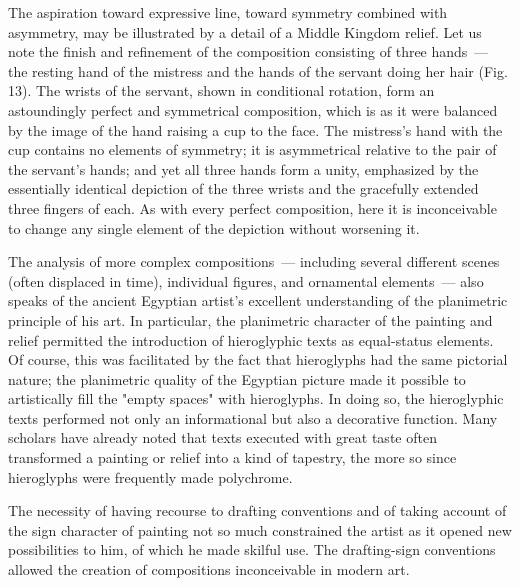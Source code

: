 

The aspiration toward expressive line, toward symmetry combined with asymmetry, may
be illustrated by a detail of a Middle Kingdom relief. Let us note the finish and
refinement of the composition consisting of three hands~--- the resting hand of the
mistress and the hands of the servant doing her hair (Fig.\,13). The wrists of the
servant, shown in conditional rotation, form an astoundingly perfect and symmetrical
composition, which is as it were balanced by the image of the hand raising a cup to the
face. The mistress's hand with the cup contains no elements of symmetry; it is
asymmetrical relative to the pair of the servant's hands; and yet all three hands form
a unity, emphasized by the essentially identical depiction of the three wrists and the
gracefully extended three fingers of each. As with every perfect composition, here it is
inconceivable to change any single element of the depiction without worsening it.

The analysis of more complex compositions~--- including several different scenes (often
displaced in time), individual figures, and ornamental elements~--- also speaks of the
ancient Egyptian artist's excellent understanding of the planimetric principle of his art.
In particular, the planimetric character of the painting and relief permitted the
introduction of hieroglyphic texts as equal-status elements. Of course, this was
facilitated by the fact that hieroglyphs had the same pictorial nature; the planimetric
quality of the Egyptian picture made it possible to artistically fill the "empty spaces"
with hieroglyphs. In doing so, the hieroglyphic texts performed not only an informational
but also a decorative function. Many scholars have already noted that texts executed
with great taste often transformed a painting or relief into a kind of tapestry, the more
so since hieroglyphs were frequently made polychrome.


The necessity of having recourse to drafting conventions and of taking account of the
sign character of painting not so much constrained the artist as it opened new
possibilities to him, of which he made skilful use. The drafting-sign conventions
allowed the creation of compositions inconceivable in modern art.


